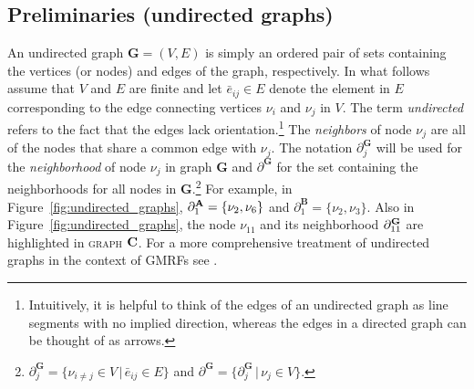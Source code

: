 \subsection{Preliminaries (undirected graphs)}
\label{undirected_graphs}

An undirected graph $\mathbf{G} = (V,E)$ is simply an ordered pair of sets containing the 
vertices (or nodes) and edges of the graph, respectively. In what follows assume that $V$ 
and $E$ are finite and let $\bar{e}_{ij} \in E$ denote the element in $E$ corresponding to the 
edge connecting vertices $\nu_i$ and $\nu_j$ in $V$. The term {\it undirected} refers to the fact 
that the edges lack orientation.\footnote{Intuitively, it is helpful to think of the edges of an 
undirected graph as line segments with no implied direction, whereas the edges in a directed 
graph can be thought of as arrows.} The {\it neighbors} of node $\nu_j$ are all of the nodes that 
share a common edge with $\nu_j$. The notation $\partial^{\mathbf{G}}_j$ will be used for the 
{\it neighborhood} of node $\nu_j$ in graph  $\mathbf{G}$ and $\partial^\mathbf{G}$ for the set 
containing the neighborhoods for all nodes in $\mathbf{G}$.\footnote{$ \partial^\mathbf{G}_j = 
\{\nu_{i \neq j} \in V \,\vert\, \bar{e}_{ij} \in E\}$ and $\partial^\mathbf{G} = \{\partial^\mathbf{G}_j \,
\vert\, \nu_j \in V\}$.} For example, in Figure~\ref{fig:undirected_graphs}, 
$\partial^{\mathbf{A}}_1 = \{\nu_2, \nu_6\}$ and $\partial^{\mathbf{B}}_1 = \{\nu_2, \nu_3\}$. 
Also in Figure~\ref{fig:undirected_graphs}, the node $\nu_{11}$ and its neighborhood 
$\partial^{\mathbf{G}}_{11}$ are highlighted in \textsc{graph $\mathbf{C}$}. 
For a more comprehensive treatment of undirected graphs in the context of GMRFs see 
. 

